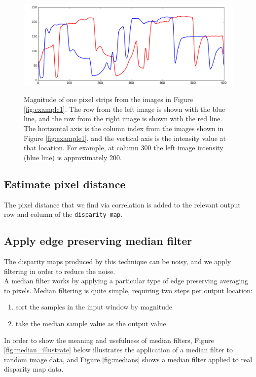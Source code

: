 \documentclass[11pt,fleqn]{article}
\begin{document}
\begin{figure}[!h]
\begin{mdframed}
\centering
\includegraphics[width=1\textwidth]{images/strips.png} \\[2pt]
\caption[Intensity of the one pixel strips taken from the images in Figure \ref{fig:example1}]{Magnitude of one pixel strips from the images in Figure \ref{fig:example1}. The row from the left image is shown with the blue line, and the row from the right image is shown with the red line. The horizontal axis is the column index from the images shown in Figure \ref{fig:example1}, and the vertical axis is the intensity value at that location. For example, at column 300 the left image intensity (blue line) is approximately 200.}
\label{fig:strips}
\end{mdframed}
\end{figure}

\subsection{Estimate pixel distance}
The pixel distance that we find via correlation is added to the relevant output row and column of the \texttt{disparity map}.

\subsection{Apply edge preserving median filter}

The disparity maps produced by this technique can be noisy, and we apply filtering in order to reduce the noise.\\[5pt]
%
A median filter works by applying a particular type of edge preserving averaging to pixels. Median filtering is quite simple, requiring two steps per output location:

\begin{enumerate}
\item sort the samples in the input window by magnitude
\item take the median sample value as the output value
\end{enumerate}
%
In order to show the meaning and usefulness of median filters, Figure \ref{fig:median_illustrate} below illustrates the application of a median filter to random image data, and Figure \ref{fig:medians} shows a median filter applied to real disparity map data.\\
\end{document}
